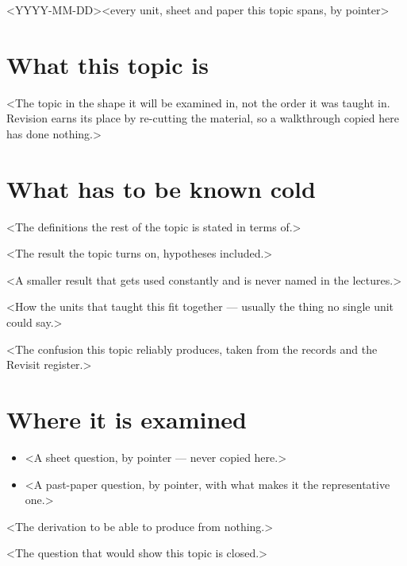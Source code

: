 \documentclass[a4paper,10pt]{article}
\begin{document}
%
  {<YYYY-MM-DD>}{<every unit, sheet and paper this topic spans, by pointer>}

\section{What this topic is}
<The topic in the shape it will be examined in, not the order it was taught in. Revision earns its
place by re-cutting the material, so a walkthrough copied here has done nothing.>

\section{What has to be known cold}

\begin{defn}[<term>]
<The definitions the rest of the topic is stated in terms of.>
\end{defn}

\begin{thm}[<name>]
<The result the topic turns on, hypotheses included.>
\end{thm}

\begin{prop}
<A smaller result that gets used constantly and is never named in the lectures.>
\end{prop}

\begin{remark}
<How the units that taught this fit together — usually the thing no single unit could say.>
\end{remark}

\begin{warning}
<The confusion this topic reliably produces, taken from the records and the Revisit register.>
\end{warning}

\section{Where it is examined}
\begin{itemize}
  \item <A sheet question, by pointer — never copied here.>
  \item <A past-paper question, by pointer, with what makes it the representative one.>
\end{itemize}

\begin{checkyourself}
  \item <The derivation to be able to produce from nothing.>
  \item <The question that would show this topic is closed.>
\end{checkyourself}
\end{document}
